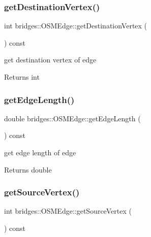 \subsubsection{\texorpdfstring{getDestinationVertex()}{getDestinationVertex()}}
{\footnotesize\ttfamily int bridges\+::\+O\+S\+M\+Edge\+::get\+Destination\+Vertex (\begin{DoxyParamCaption}{ }\end{DoxyParamCaption}) const\hspace{0.3cm}{\ttfamily [inline]}}

get destination vertex of edge

\begin{DoxyReturn}{Returns}
int 
\end{DoxyReturn}
\mbox{\label{classbridges_1_1_o_s_m_edge_a3cb7d8550367d382ec712d08eb5e48db}} 
\subsubsection{\texorpdfstring{getEdgeLength()}{getEdgeLength()}}
{\footnotesize\ttfamily double bridges\+::\+O\+S\+M\+Edge\+::get\+Edge\+Length (\begin{DoxyParamCaption}{ }\end{DoxyParamCaption}) const\hspace{0.3cm}{\ttfamily [inline]}}

get edge length of edge

\begin{DoxyReturn}{Returns}
double 
\end{DoxyReturn}
\mbox{\label{classbridges_1_1_o_s_m_edge_a0779634f83c4b386d10bbfd722a0f0b7}} 
\subsubsection{\texorpdfstring{getSourceVertex()}{getSourceVertex()}}
{\footnotesize\ttfamily int bridges\+::\+O\+S\+M\+Edge\+::get\+Source\+Vertex (\begin{DoxyParamCaption}{ }\end{DoxyParamCaption}) const\hspace{0.3cm}{\ttfamily [inline]}}

